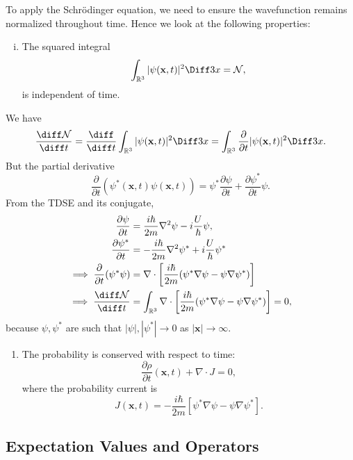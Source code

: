 \documentclass[12pt]{article}
\begin{document}
To apply the Schr\"{o}dinger equation, we need to ensure the wavefunction remains normalized throughout time. Hence we look at the following properties:

\begin{enumerate}[(i)]
	\item The squared integral
		\[
			\int_{\mathbb{R}^3}|\psi(\mathbf{x}, t)|^2\Diff3 x = \mathcal{N}
		,\]
		is independent of time.
\end{enumerate}

\begin{proofbox}	
We have
	\[
		\frac{\diff \mathcal{N}}{\diff t} = \frac{\diff}{\diff t} \int_{\mathbb{R}^3} |\psi(\mathbf{x}, t)|^2\Diff 3 x = \int_{\mathbb{R}^3} \frac{\partial}{\partial t}|\psi(\mathbf{x}, t)|^2\Diff3 x
	.\]
	But the partial derivative
	\[
		\frac{\partial}{\partial t}(\psi^{\ast}(\mathbf{x}, t) \psi(\mathbf{x}, t)) = \psi^{\ast} \frac{\partial \psi}{\partial t} + \frac{\partial \psi^{\ast}}{\partial t}\psi
	.\]
	From the TDSE and its conjugate,
	\begin{align*}
		\frac{\partial \psi}{\partial t} &= \frac{i \hbar}{2m} \nabla^2 \psi - i \frac{U}{\hbar}\psi, \\
		\frac{\partial \psi^{\ast}}{\partial t} &= - \frac{i\hbar}{2m} \nabla^2\psi^{\ast} + i \frac{U}{\hbar} \psi^{\ast} \\
		\implies \frac{\partial}{\partial t}(\psi^{\ast}\psi) &= \nabla \cdot \left[\frac{i\hbar}{2m} (\psi^{\ast}\nabla\psi - \psi\nabla\psi^{\ast}) \right] \\
		\implies \frac{\diff \mathcal{N}}{\diff t} &= \int_{\mathbb{R}^3} \nabla \cdot \left[\frac{i \hbar}{2m} (\psi^{\ast}\nabla \psi - \psi \nabla \psi^{\ast})\right] = 0,
	\end{align*}
	because $\psi, \psi^{\ast}$ are such that $|\psi|, |\psi^{\ast}| \to 0$ as $|\mathbf{x}| \to \infty$.
\end{proofbox}
\begin{enumerate}[resume*]
	\item The probability is conserved with respect to time:
		\[
			\frac{\partial \rho}{\partial t} (\mathbf{x}, t) + \nabla \cdot J = 0
		,\]
		where the probability current is
		\[
			J(\mathbf{x}, t) = - \frac{i \hbar}{2m} \left[ \psi^{\ast}\nabla \psi - \psi\nabla\psi^{\ast}\right]
		.\]
\end{enumerate}

\subsection{Expectation Values and Operators}%
\label{sub:expectation_values_and_operators}
\end{document}

